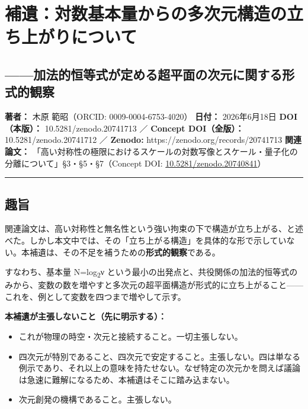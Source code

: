 \documentclass[11pt]{ltjsarticle}
\providecommand{\tightlist}{\setlength{\itemsep}{0pt}\setlength{\parskip}{0pt}}
\begin{document}
\section{補遺：対数基本量からの多次元構造の立ち上がりについて}\label{ux88dcux907aux5bfeux6570ux57faux672cux91cfux304bux3089ux306eux591aux6b21ux5143ux69cbux9020ux306eux7acbux3061ux4e0aux304cux308aux306bux3064ux3044ux3066}

\subsection{------加法的恒等式が定める超平面の次元に関する形式的観察}\label{ux52a0ux6cd5ux7684ux6052ux7b49ux5f0fux304cux5b9aux3081ux308bux8d85ux5e73ux9762ux306eux6b21ux5143ux306bux95a2ux3059ux308bux5f62ux5f0fux7684ux89b3ux5bdf}

\textbf{著者：} 木原 範昭（ORCID: 0009-0004-6753-4020） \textbf{日付：}
2026年6月18日 \textbf{DOI（本版）：} 10.5281/zenodo.20741713 ／
\textbf{Concept DOI（全版）：} 10.5281/zenodo.20741712 ／
\textbf{Zenodo:} https://zenodo.org/records/20741713 \textbf{関連論文：}
「高い対称性の極限におけるスケールの対数写像とスケール・量子化の分離について」§3・§5・§7（Concept
DOI:
\href{https://doi.org/10.5281/zenodo.20740841}{10.5281/zenodo.20740841}）

\begin{center}\rule{0.5\linewidth}{0.5pt}\end{center}

\subsection{趣旨}\label{ux8da3ux65e8}

関連論文は、高い対称性と無名性という強い拘束の下で構造が立ち上がる、と述べた。しかし本文中では、その「立ち上がる構造」を具体的な形で示していない。本補遺は、その不足を補うための\textbf{形式的観察}である。

すなわち、基本量 N=log\textsubscript{2}ν
という最小の出発点と、共役関係の加法的恒等式のみから、変数の数を増やすと多次元の超平面構造が形式的に立ち上がること------これを、例として変数を四つまで増やして示す。

\textbf{本補遺が主張しないこと（先に明示する）：}

\begin{itemize}
\tightlist
\item
  これが物理の時空・次元と接続すること。一切主張しない。
\item
  四次元が特別であること、四次元で安定すること。主張しない。四は単なる例示であり、それ以上の意味を持たせない。なぜ特定の次元かを問えば議論は急速に難解になるため、本補遺はそこに踏み込まない。
\item
  次元創発の機構であること。主張しない。
\end{itemize}
\end{document}
